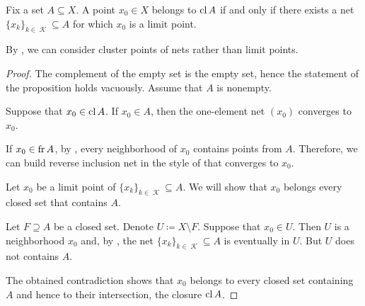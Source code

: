 \begin{proposition}\label{thm:limit_point_iff_in_closure}
  Fix a set \( A \subseteq X \). A point \( x_0 \in X \) belongs to \( \operatorname{cl}{A} \) if and only if there exists a net \( \{ x_k \}_{k \in \mscrK} \subseteq A \) for which \( x_0 \) is a limit point.

  By , we can consider cluster points of nets rather than limit points.
\end{proposition}
\begin{proof}
  The complement of the empty set is the empty set, hence the statement of the proposition holds vacuously. Assume that \( A \) is nonempty.

  \SufficiencySubProof Suppose that \( x_0 \in \operatorname{cl}{A} \). If \( x_0 \in A \), then the one-element net \( (x_0) \) converges to \( x_0 \).

  If \( x_0 \in \operatorname{fr}{A} \), by , every neighborhood of \( x_0 \) contains points from \( A \). Therefore, we can build reverse inclusion net in the style of  that converges to \( x_0 \).

  \NecessitySubProof Let \( x_0 \) be a limit point of \( \{ x_k \}_{k \in \mscrK} \subseteq A \). We will show that \( x_0 \) belongs every closed set that contains \( A \).

  Let \( F \supseteq A \) be a closed set. Denote \( U \coloneqq X \setminus F \). Suppose that \( x_0 \in U \). Then \( U \) is a neighborhood \( x_0 \) and, by , the net \( \{ x_k \}_{k \in \mscrK} \subseteq A \) is eventually in \( U \). But \( U \) does not contains \( A \).

  The obtained contradiction shows that \( x_0 \) belongs to every closed set containing \( A \) and hence to their intersection, the closure \( \operatorname{cl} A \).
\end{proof}

